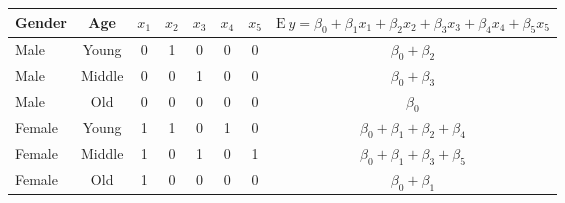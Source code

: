 \begin{frame}[shrink=10]
\begin{itemize}
\begin{itemize}
  \begin{center}
\begin{tabular}{lc|ccccc|c}
\hline Gender & Age & $x_1$ & $x_2$ &  $x_3$ &  $x_4$ &  $x_5$ & $
\mathrm{E~}y=\beta_0 + \beta_1 x_1+ \beta_2 x_2+ \beta_3 x_3+
\beta_4 x_4+ \beta_5 x_5$
\\
\hline
Male & Young    & 0 & 1 & 0 & 0 & 0 & $\beta_0 +\beta_2$\\
Male & Middle   & 0 & 0 & 1 & 0 & 0 & $\beta_0 +\beta_3$\\
Male & Old      & 0 & 0 & 0 & 0 & 0 & $\beta_0 $\\
Female & Young  & 1 & 1 & 0 & 1 & 0 & $\beta_0 +\beta_1+\beta_2+\beta_4$\\
Female & Middle & 1 & 0 & 1 & 0 & 1 & $\beta_0 +\beta_1+\beta_3+\beta_5$\\
Female & Old    & 1 & 0 & 0 & 0 & 0 & $\beta_0 +\beta_1$\\
 \hline
\end{tabular}
 \end{center}  




\end{itemize}
\end{itemize}
\end{frame}
